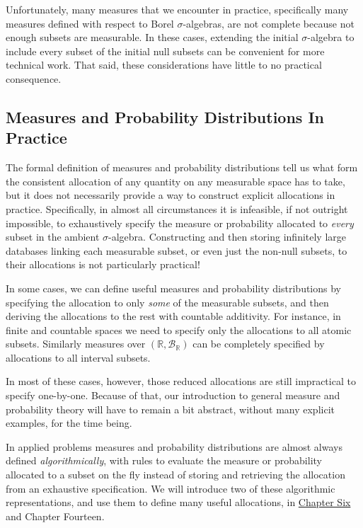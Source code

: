 \documentclass[
  letterpaper,
  DIV=11,
  numbers=noendperiod]{scrartcl}
\begin{document}
Unfortunately, many measures that we encounter in practice, specifically
many measures defined with respect to Borel \(\sigma\)-algebras, are not
complete because not enough subsets are measurable. In these cases,
extending the initial \(\sigma\)-algebra to include every subset of the
initial null subsets can be convenient for more technical work. That
said, these considerations have little to no practical consequence.

\subsection{Measures and Probability Distributions In
Practice}\label{measures-and-probability-distributions-in-practice}

The formal definition of measures and probability distributions tell us
what form the consistent allocation of any quantity on any measurable
space has to take, but it does not necessarily provide a way to
construct explicit allocations in practice. Specifically, in almost all
circumstances it is infeasible, if not outright impossible, to
exhaustively specify the measure or probability allocated to
\emph{every} subset in the ambient \(\sigma\)-algebra. Constructing and
then storing infinitely large databases linking each measurable subset,
or even just the non-null subsets, to their allocations is not
particularly practical!

In some cases, we can define useful measures and probability
distributions by specifying the allocation to only \emph{some} of the
measurable subsets, and then deriving the allocations to the rest with
countable additivity. For instance, in finite and countable spaces we
need to specify only the allocations to all atomic subsets. Similarly
measures over \((\mathbb{R}, \mathcal{B}_{\mathbb{R}})\) can be
completely specified by allocations to all interval subsets.

In most of these cases, however, those reduced allocations are still
impractical to specify one-by-one. Because of that, our introduction to
general measure and probability theory will have to remain a bit
abstract, without many explicit examples, for the time being.

In applied problems measures and probability distributions are almost
always defined \emph{algorithmically}, with rules to evaluate the
measure or probability allocated to a subset on the fly instead of
storing and retrieving the allocation from an exhaustive specification.
We will introduce two of these algorithmic representations, and use them
to define many useful allocations, in
\href{http://www.symplectomorphic.com/assets/chapters_html/density_functions.html}{Chapter
Six} and Chapter Fourteen.
\end{document}
